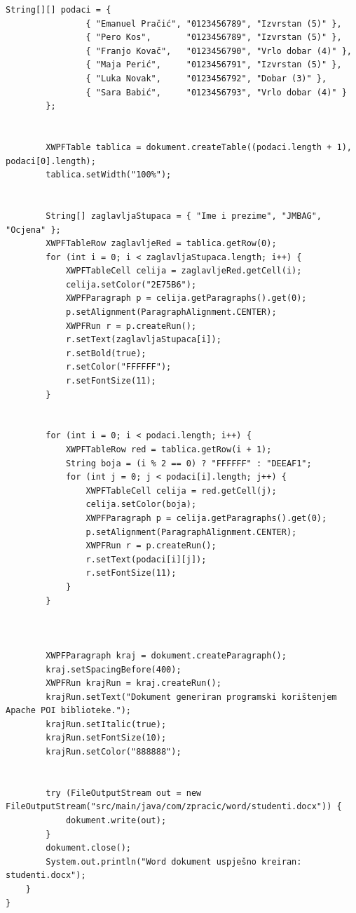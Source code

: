 \documentclass[]{foi}
\begin{document}
\begin{lstlisting}[style=Java, caption=Kreiranje word dokument]
        String[][] podaci = {
                { "Emanuel Pračić", "0123456789", "Izvrstan (5)" },
                { "Pero Kos",       "0123456789", "Izvrstan (5)" },
                { "Franjo Kovač",   "0123456790", "Vrlo dobar (4)" },
                { "Maja Perić",     "0123456791", "Izvrstan (5)" },
                { "Luka Novak",     "0123456792", "Dobar (3)" },
                { "Sara Babić",     "0123456793", "Vrlo dobar (4)" }
        };


        XWPFTable tablica = dokument.createTable((podaci.length + 1), podaci[0].length);
        tablica.setWidth("100%");
        

        String[] zaglavljaStupaca = { "Ime i prezime", "JMBAG", "Ocjena" };
        XWPFTableRow zaglavljeRed = tablica.getRow(0);
        for (int i = 0; i < zaglavljaStupaca.length; i++) {
            XWPFTableCell celija = zaglavljeRed.getCell(i);
            celija.setColor("2E75B6");
            XWPFParagraph p = celija.getParagraphs().get(0);
            p.setAlignment(ParagraphAlignment.CENTER);
            XWPFRun r = p.createRun();
            r.setText(zaglavljaStupaca[i]);
            r.setBold(true);
            r.setColor("FFFFFF");
            r.setFontSize(11);
        }


        for (int i = 0; i < podaci.length; i++) {
            XWPFTableRow red = tablica.getRow(i + 1);
            String boja = (i % 2 == 0) ? "FFFFFF" : "DEEAF1";
            for (int j = 0; j < podaci[i].length; j++) {
                XWPFTableCell celija = red.getCell(j);
                celija.setColor(boja);
                XWPFParagraph p = celija.getParagraphs().get(0);
                p.setAlignment(ParagraphAlignment.CENTER);
                XWPFRun r = p.createRun();
                r.setText(podaci[i][j]);
                r.setFontSize(11);
            }
        }



        XWPFParagraph kraj = dokument.createParagraph();
        kraj.setSpacingBefore(400);
        XWPFRun krajRun = kraj.createRun();
        krajRun.setText("Dokument generiran programski korištenjem Apache POI biblioteke.");
        krajRun.setItalic(true);
        krajRun.setFontSize(10);
        krajRun.setColor("888888");
        

        try (FileOutputStream out = new FileOutputStream("src/main/java/com/zpracic/word/studenti.docx")) {
            dokument.write(out);
        }
        dokument.close();
        System.out.println("Word dokument uspješno kreiran: studenti.docx");
    }
}
\end{lstlisting}
\end{document}
